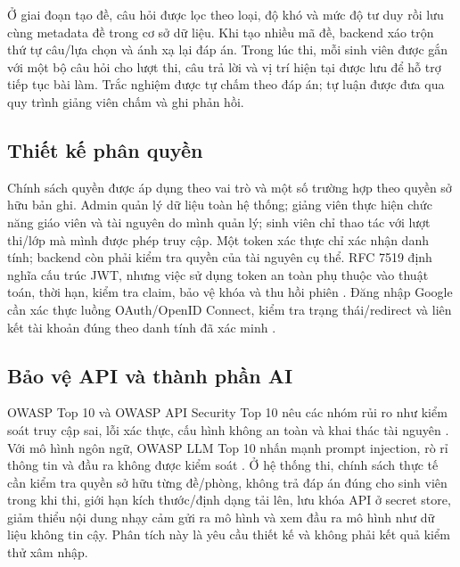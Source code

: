 Ở giai đoạn tạo đề, câu hỏi được lọc theo loại, độ khó và mức độ tư duy rồi
lưu cùng metadata đề trong cơ sở dữ liệu. Khi tạo nhiều mã đề, backend xáo
trộn thứ tự câu/lựa chọn và ánh xạ lại đáp án. Trong lúc thi, mỗi sinh viên
được gắn với một bộ câu hỏi cho lượt thi, câu trả lời và vị trí hiện tại
được lưu để hỗ trợ tiếp tục bài làm. Trắc nghiệm được tự chấm theo đáp án;
tự luận được đưa qua quy trình giảng viên chấm và ghi phản hồi.

\subsection{Thiết kế phân quyền}
Chính sách quyền được áp dụng theo vai trò và một số trường hợp theo quyền
sở hữu bản ghi. Admin quản lý dữ liệu toàn hệ thống; giảng viên thực hiện
chức năng giáo viên và tài nguyên do mình quản lý; sinh viên chỉ thao tác
với lượt thi/lớp mà mình được phép truy cập. Một token xác thực chỉ xác
nhận danh tính; backend còn phải kiểm tra quyền của tài nguyên cụ thể. RFC
7519 định nghĩa cấu trúc JWT, nhưng việc sử dụng token an toàn phụ thuộc
vào thuật toán, thời hạn, kiểm tra claim, bảo vệ khóa và thu hồi phiên
\cite{RFC7519}. Đăng nhập Google cần xác thực luồng OAuth/OpenID Connect,
kiểm tra trạng thái/redirect và liên kết tài khoản đúng theo danh tính đã
xác minh \cite{GoogleOIDC}.

\subsection{Bảo vệ API và thành phần AI}
OWASP Top 10 và OWASP API Security Top 10 nêu các nhóm rủi ro như kiểm soát
truy cập sai, lỗi xác thực, cấu hình không an toàn và khai thác tài nguyên
\cite{OWASPTop10,OWASPAPI}. Với mô hình ngôn ngữ, OWASP LLM Top 10 nhấn mạnh
prompt injection, rò rỉ thông tin và đầu ra không được kiểm soát
\cite{OWASPLLM}. Ở hệ thống thi, chính sách thực tế cần kiểm tra quyền sở
hữu từng đề/phòng, không trả đáp án đúng cho sinh viên trong khi thi, giới
hạn kích thước/định dạng tải lên, lưu khóa API ở secret store, giảm thiểu
nội dung nhạy cảm gửi ra mô hình và xem đầu ra mô hình như dữ liệu không
tin cậy. Phân tích này là yêu cầu thiết kế và không phải kết quả kiểm thử
xâm nhập.
